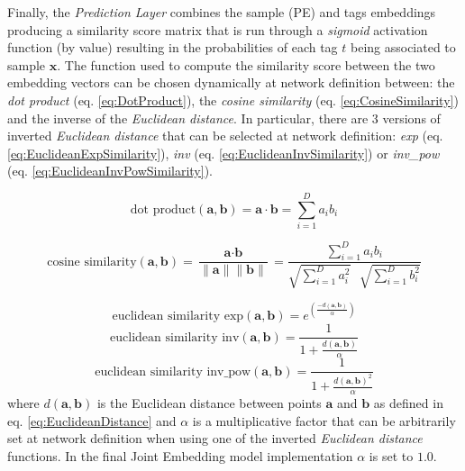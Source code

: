\documentclass[pdfa%
,cucitura%
]{toptesi}
\begin{document}
Finally, the \textit{Prediction Layer} combines the sample (PE) and tags embeddings producing a similarity score matrix that is run through a \textit{sigmoid} activation function (by value) resulting in the probabilities of each tag $t$ being associated to sample $\textbf{x}$. The function used to compute the similarity score between the two embedding vectors can be chosen dynamically at network definition between: the \textit{dot product} (eq. \ref{eq:DotProduct}), the \textit{cosine similarity} (eq. \ref{eq:CosineSimilarity}) and the inverse of the \textit{Euclidean distance}. In particular, there are 3 versions of inverted \textit{Euclidean distance} that can be selected at network definition: \textit{exp} (eq. \ref{eq:EuclideanExpSimilarity}), \textit{inv} (eq. \ref{eq:EuclideanInvSimilarity}) or \textit{inv\_pow} (eq. \ref{eq:EuclideanInvPowSimilarity}).

\begin{equation}\label{eq:DotProduct}
	\text{dot product}(\textbf{a}, \textbf{b}) = \textbf{a} \cdot \textbf{b} = \sum_{i=1}^{D} a_i b_i
\end{equation}

\begin{equation}\label{eq:CosineSimilarity}
	\text{cosine similarity}(\textbf{a}, \textbf{b}) = \frac{\textbf{a} \cdot \textbf{b}}{\|\textbf{a}\| \|\textbf{b}\|} = \frac{\sum_{i=1}^{D} a_i b_i}{\sqrt{\sum_{i=1}^{D} a_{i}^2} \text{ } \sqrt{\sum_{i=1}^{D} b_{i}^2}}
\end{equation}

\begin{equation}\label{eq:EuclideanExpSimilarity}
	\text{euclidean similarity exp}(\textbf{a}, \textbf{b}) = e^{(\frac{-d(\textbf{a}, \textbf{b})}{\alpha})}
\end{equation}
\begin{equation}\label{eq:EuclideanInvSimilarity}
	\text{euclidean similarity inv}(\textbf{a}, \textbf{b}) = \frac{1}{1+\frac{d(\textbf{a}, \textbf{b})}{\alpha}}
\end{equation}
\begin{equation}\label{eq:EuclideanInvPowSimilarity}
	\text{euclidean similarity inv\_pow}(\textbf{a}, \textbf{b}) = \frac{1}{1+\frac{d(\textbf{a}, \textbf{b})^2}{\alpha}}
\end{equation}
where $d(\textbf{a}, \textbf{b})$ is the Euclidean distance between points $\textbf{a}$ and $\textbf{b}$ as defined in eq. \ref{eq:EuclideanDistance} and $\alpha$ is a multiplicative factor that can be arbitrarily set at network definition when using one of the inverted \textit{Euclidean distance} functions. In the final Joint Embedding model implementation $\alpha$ is set to $1.0$.
\end{document}
